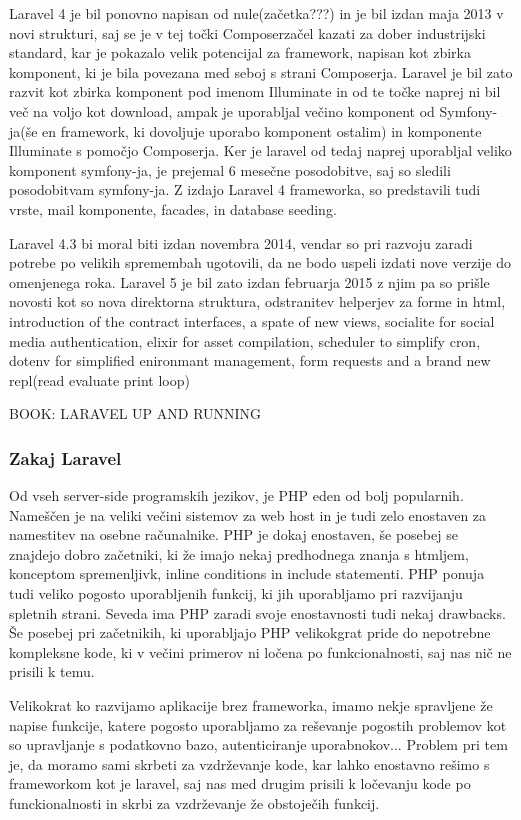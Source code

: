\documentclass[12pt,a4paper,titlepage,openany]{report}
\begin{document}
Laravel 4 je bil ponovno napisan od nule(začetka???) in je bil izdan maja 2013 v novi strukturi, saj se je v tej točki Composerzačel kazati za dober industrijski standard, kar je pokazalo velik potencijal za framework, napisan kot zbirka komponent, ki je bila povezana med seboj s strani Composerja. Laravel je bil zato razvit kot zbirka komponent pod imenom Illuminate in od te točke naprej ni bil več na voljo kot download, ampak je uporabljal večino komponent od Symfony-ja(še en framework, ki dovoljuje uporabo komponent ostalim) in komponente Illuminate s pomočjo Composerja. Ker je laravel od tedaj naprej uporabljal veliko komponent symfony-ja, je prejemal 6 mesečne posodobitve, saj so sledili posodobitvam symfony-ja. Z izdajo Laravel 4 frameworka, so predstavili tudi vrste, mail komponente, facades, in database seeding.

Laravel 4.3 bi moral biti izdan novembra 2014, vendar so pri razvoju zaradi potrebe po velikih spremembah ugotovili, da ne bodo uspeli izdati nove verzije do omenjenega roka. Laravel 5 je bil zato izdan februarja 2015 z njim pa so prišle novosti kot so nova direktorna struktura, odstranitev helperjev za forme in html, introduction of the contract interfaces, a spate of new views, socialite for social media authentication, elixir for asset compilation, scheduler to simplify cron, dotenv for simplified enironmant management, form requests and a brand new repl(read evaluate print loop)


BOOK: LARAVEL UP AND RUNNING

\subsubsection{Zakaj Laravel}

Od vseh server-side programskih jezikov, je PHP eden od bolj popularnih. Nameščen je na veliki večini sistemov za web host in je tudi zelo enostaven za namestitev na osebne računalnike. PHP je dokaj enostaven, še posebej se znajdejo dobro začetniki, ki že imajo nekaj predhodnega znanja s htmljem, konceptom spremenljivk, inline conditions in include statementi. PHP ponuja tudi veliko pogosto uporabljenih funkcij, ki jih uporabljamo pri razvijanju spletnih strani. Seveda ima PHP zaradi svoje enostavnosti tudi nekaj drawbacks. Še posebej pri začetnikih, ki uporabljajo PHP velikokgrat pride do nepotrebne kompleksne kode, ki v večini primerov ni ločena po funkcionalnosti, saj nas nič ne prisili k temu. 

Velikokrat ko razvijamo aplikacije brez frameworka, imamo nekje spravljene že napise funkcije, katere pogosto uporabljamo za reševanje pogostih problemov kot so upravljanje s podatkovno bazo, autenticiranje uporabnokov... Problem pri tem je, da moramo sami skrbeti za vzdrževanje kode, kar lahko enostavno rešimo s frameworkom kot je laravel, saj nas med drugim prisili k ločevanju kode po funckionalnosti in skrbi za vzdrževanje že obstoječih funkcij.
\end{document}
